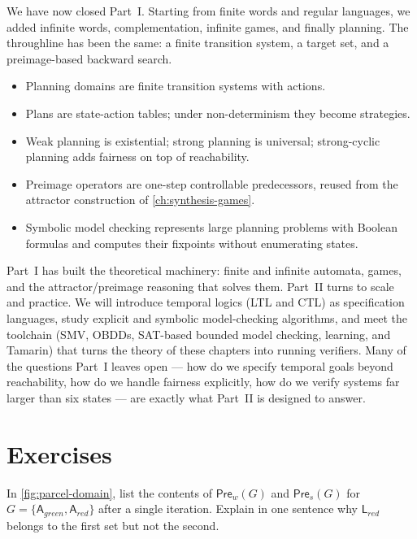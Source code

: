 \begin{summarybox}
We have now closed Part~I.  Starting from finite words and regular
languages, we added infinite words, complementation, infinite games,
and finally planning.  The throughline has been the same: a finite
transition system, a target set, and a preimage-based backward search.
\begin{itemize}[nosep]
  \item Planning domains are finite transition systems with actions.
  \item Plans are state-action tables; under non-determinism they
        become strategies.
  \item Weak planning is existential; strong planning is universal;
        strong-cyclic planning adds fairness on top of reachability.
  \item Preimage operators are one-step controllable predecessors,
        reused from the attractor construction of \cref{ch:synthesis-games}.
  \item Symbolic model checking represents large planning problems
        with Boolean formulas and computes their fixpoints without
        enumerating states.
\end{itemize}

Part~I has built the theoretical machinery: finite and infinite
automata, games, and the attractor/preimage reasoning that solves them.
Part~II turns to scale and practice.  We will introduce temporal logics
(LTL and CTL) as specification languages, study explicit and symbolic
model-checking algorithms, and meet the toolchain (SMV, OBDDs,
SAT-based bounded model checking, learning, and Tamarin) that turns
the theory of these chapters into running verifiers.  Many of the
questions Part~I leaves open --- how do we specify temporal goals
beyond reachability, how do we handle fairness explicitly, how do we
verify systems far larger than six states --- are exactly what Part~II
is designed to answer.
\end{summarybox}

\section*{Exercises}

\begin{chapex}
In \cref{fig:parcel-domain}, list the contents of $\mathsf{Pre}_w(G)$
and $\mathsf{Pre}_s(G)$ for $G=\{\mathsf{A}_\mathit{green},\mathsf{A}_\mathit{red}\}$
after a single iteration.  Explain in one sentence why
$\mathsf{L}_\mathit{red}$ belongs to the first set but not the second.
\end{chapex}


